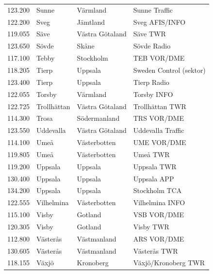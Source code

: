 \begin{longtable}{rlll}
  123.200 & Sunne        & Värmland        & Sunne Traffic                   \\
  122.200 & Sveg         & Jämtland        & Sveg AFIS/INFO                  \\
  119.055 & Säve         & Västra Götaland & Säve TWR                        \\
  123.650 & Sövde        & Skåne           & Sövde Radio                     \\
  117.100 & Tebby        & Stockholm       & TEB VOR/DME                     \\
  118.205 & Tierp        & Uppsala         & Sweden Control (sektor)         \\
  123.400 & Tierp        & Uppsala         & Tierp Radio                     \\
  122.055 & Torsby       & Värmland        & Torsby INFO                     \\
  122.725 & Trollhättan  & Västra Götaland & Trollhättan TWR                 \\
  114.300 & Trosa        & Södermanland    & TRS VOR/DME                     \\
  123.550 & Uddevalla    & Västra Götaland & Uddevalla Traffic               \\
  114.100 & Umeå         & Västerbotten    & UME VOR/DME                     \\
  119.805 & Umeå         & Västerbotten    & Umeå TWR                        \\
  119.200 & Uppsala      & Uppsala         & Uppsala TWR                     \\
  130.400 & Uppsala      & Uppsala         & Uppsala APP                     \\
  134.200 & Uppsala      & Uppsala         & Stockholm TCA                   \\
  122.555 & Vilhelmina   & Västerbotten    & Vilhelmina INFO                 \\
  115.100 & Visby        & Gotland         & VSB VOR/DME                     \\
  120.305 & Visby        & Gotland         & Visby TWR                       \\
  112.800 & Västerås     & Västmanland     & ARS VOR/DME                     \\
  130.605 & Västerås     & Västmanland     & Västerås TWR                    \\
  118.155 & Växjö        & Kronoberg       & Växjö/Kronoberg TWR             \\

\end{longtable}
